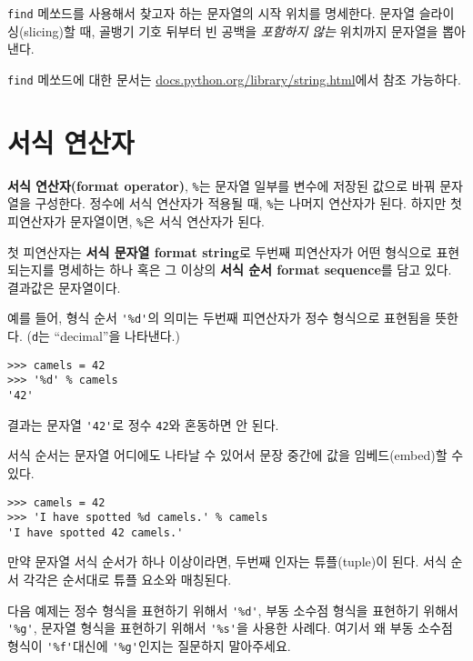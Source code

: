{\tt find} 메쏘드를 사용해서 찾고자 하는 문자열의 시작 위치를 명세한다. 
문자열 슬라이싱(slicing)할 때, 골뱅기 기호 뒤부터 빈 공백을 \emph{포함하지 않는} 위치까지 문자열을 뽑아낸다.

{\tt find} 메쏘드에 대한 문서는 \url{docs.python.org/library/string.html}에서 참조 가능하다.

\section{    서식 연산자}


{\bf 서식 연산자(format operator)}, {\tt \%}는 문자열 일부를 변수에 저장된 값으로 바꿔 문자열을 구성한다.
정수에 서식 연산자가 적용될 때, {\tt \%}는 나머지 연산자가 된다. 
하지만 첫 피연산자가 문자열이면, {\tt \%}은 서식 연산자가 된다.


첫 피연산자는 {\bf 서식 문자열 format string}로 두번째 피연산자가 어떤 형식으로 표현되는지를 명세하는 하나 혹은 그 이상의 
{\bf 서식 순서 format sequence}를 담고 있다. 
결과값은 문자열이다.


예를 들어, 형식 순서 \verb"'%d'"의 의미는 두번째 피연산자가 정수 형식으로 표현됨을 뜻한다. ({\tt d}는 ``decimal''을 나타낸다.)

\beforeverb
\begin{verbatim}
>>> camels = 42
>>> '%d' % camels
'42'
\end{verbatim}
\afterverb
%

결과는 문자열 \verb"'42'"로 정수 {\tt 42}와 혼동하면 안 된다.

서식 순서는 문자열 어디에도 나타날 수 있어서 문장 중간에 값을 임베드(embed)할 수 있다.

\beforeverb
\begin{verbatim}
>>> camels = 42
>>> 'I have spotted %d camels.' % camels
'I have spotted 42 camels.'
\end{verbatim}
\afterverb
%

만약 문자열 서식 순서가 하나 이상이라면, 두번째 인자는 튜플(tuple)이 된다.
서식 순서 각각은 순서대로 튜플 요소와 매칭된다.

다음 예제는 정수 형식을 표현하기 위해서 \verb"'%d'", 부동 소수점 형식을 표현하기 위해서 \verb"'%g'",
문자열 형식을 표현하기 위해서 \verb"'%s'"을 사용한 사례다. 
여기서 왜 부동 소수점 형식이  \verb"'%f'"대신에 \verb"'%g'"인지는 질문하지 말아주세요.

